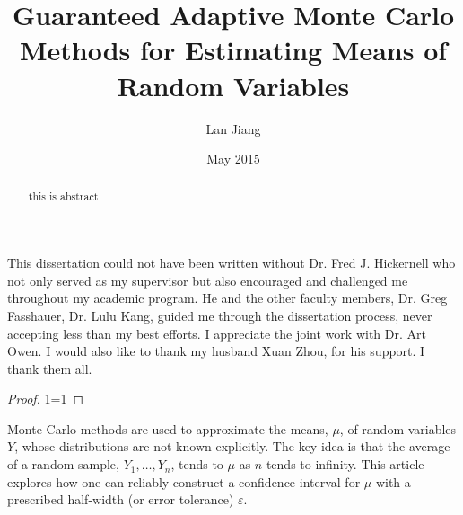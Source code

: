 \documentclass{iitthesis}
\begin{document}

\title{Guaranteed Adaptive Monte Carlo Methods for Estimating Means of Random Variables}
\author{Lan Jiang}
 
\date{May 2015}
\maketitle                %


\prelimpages         %


\begin{acknowledgement}     %
\par  This dissertation could not have been written without Dr. Fred
J. Hickernell who not only served as my supervisor but also
encouraged and challenged me throughout my academic program. He and
the other faculty members, Dr. Greg Fasshauer,
Dr. Lulu Kang, guided me through the dissertation process,
never accepting less than my best efforts. I appreciate the joint
work with Dr. Art Owen. I would
also like to thank my husband Xuan Zhou, for his support. I thank them all.
\begin{proof}
1=1
\end{proof}
\end{acknowledgement}


\tableofcontents
 \clearpage

\listoftables

\clearpage

\listoffigures

\clearpage



\begin{abstract}           %
this is abstract
\end{abstract}
\textpages     %
\label{introduction}
Monte Carlo methods are used to approximate the means, $\mu$, of random variables $Y$, whose distributions are not known explicitly.  The key idea is that the average of a random sample, $Y_1, \ldots, Y_n$, tends to $\mu$ as $n$ tends to infinity. This article explores how one can reliably construct a confidence interval for $\mu$ with a prescribed half-width (or error tolerance) $\varepsilon$.  
\end{document}
